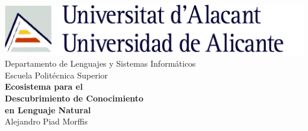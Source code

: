 \begin{titlepage}

\center %



\includegraphics[scale=.60]{./Images//Chapters/Cover/UA.jpg}\\[.5cm] %



{\Large Departamento de Lenguajes y Sistemas Inform{\'a}ticos}\\[0.25cm] %
{\Large Escuela Polit{\'e}cnica Superior}\\[2.0cm] %


{ \huge \bfseries Ecosistema para el}\\[0.3cm]
{ \huge \bfseries Descubrimiento de Conocimiento}\\[0.3cm]
{ \huge \bfseries en Lenguaje Natural}\\[1.5cm] %


{ \LARGE Alejandro Piad Morffis}\\[1.5cm]




\end{titlepage}
